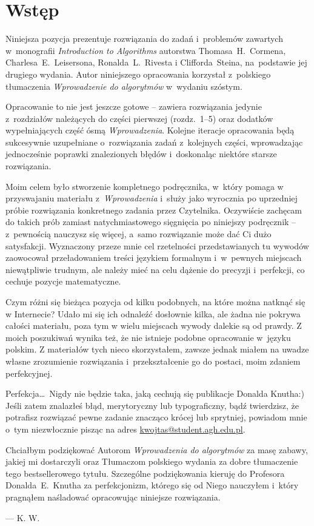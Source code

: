 \chapter{\sffamily\bfseries Wstęp}

Niniejsza pozycja prezentuje rozwiązania do zadań i~problemów zawartych w~monografii \textit{Introduction to Algorithms} autorstwa Thomasa~H.~Cormena, Charlesa~E.~Leisersona, Ronalda~L.~Rivesta i Clifforda~Steina, na~podstawie jej drugiego wydania. Autor niniejszego opracowania korzystał z~polskiego tłumaczenia \textit{Wprowadzenie do algorytmów} w~wydaniu szóstym.

Opracowanie to nie jest jeszcze gotowe -- zawiera rozwiązania jedynie z~rozdziałów należących do części pierwszej (rozdz.~1\nobreakdash--5) oraz dodatków wypełniających część ósmą \textit{Wprowadzenia}. Kolejne iteracje opracowania będą sukcesywnie uzupełniane o~rozwiązania zadań z~kolejnych części, wprowadzając jednocześnie poprawki znalezionych błędów i~doskonaląc niektóre starsze rozwiązania.

Moim celem było stworzenie kompletnego podręcznika, w~który pomaga w przyswajaniu materiału z~\textit{Wprowadzenia} i~służy jako wyrocznia po uprzedniej próbie rozwiązania konkretnego zadania przez Czytelnika. Oczywiście zachęcam do takich prób zamiast natychmiastowego sięgnięcia po niniejszy podręcznik -- z~pewnością nauczysz się więcej, a~samo rozwiązanie może dać Ci dużo satysfakcji. Wyznaczony przeze mnie cel rzetelności przedstawianych tu wywodów zaowocował przeładowaniem treści językiem formalnym i~w~pewnych miejscach niewątpliwie trudnym, ale należy mieć na celu dążenie do precyzji i~perfekcji, co cechuje pozycje matematyczne.

Czym różni się bieżąca pozycja od kilku podobnych, na które można natknąć się w Internecie? Udało mi się ich odnaleźć dosłownie kilka, ale żadna nie pokrywa całości materiału, poza tym w wielu miejscach wywody dalekie są od prawdy. Z moich poszukiwań wynika też, że nie istnieje podobne opracowanie w~języku polskim. Z materiałów tych nieco skorzystałem, zawsze jednak miałem na uwadze własne zrozumienie rozwiązania i~przekształcenie go do postaci, moim zdaniem perfekcyjnej.

Perfekcja\dots\ Nigdy nie będzie taka, jaką cechują się publikacje Donalda Knutha:) Jeśli zatem znalazłeś błąd, merytoryczny lub typograficzny, bądź twierdzisz, że potrafisz rozwiązać pewne zadanie znacząco krócej lub sprytniej, powiadom mnie o~tym niezwłocznie pisząc na adres \url{kwojtas@student.agh.edu.pl}.

Chciałbym podziękować Autorom \textit{Wprowadzenia do algorytmów} za masę zabawy, jakiej mi dostarczyli oraz Tłumaczom polskiego wydania za dobre tłumaczenie tego bestsellerowego tytułu. Szczególne podziękowania kieruję do Profesora Donalda~E.~Knutha za perfekcjonizm, którego się od Niego nauczyłem i~który pragnąłem naśladować opracowując niniejsze rozwiązania.

\bigskip
{}\hfill--- K. W.

\endinput
